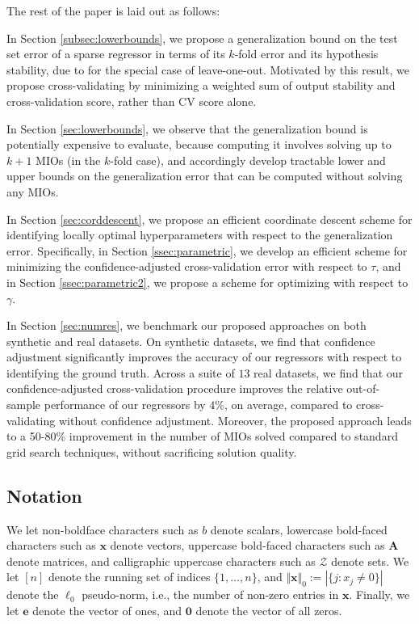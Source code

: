 \documentclass[mnsc,nonblindrev]{informs3} %
\begin{document}
The rest of the paper is laid out as follows:
\begin{itemize}{\color{black}
\item In Section \ref{subsec:lowerbounds}, we propose a generalization bound on the test set error of a sparse regressor in terms of its $k$-fold error and its hypothesis stability, due to \cite{bousquet2002stability} for the special case of leave-one-out. Motivated by this result, we propose cross-validating by minimizing a weighted sum of output stability and cross-validation score, rather than CV score alone.}
\item In Section \ref{sec:lowerbounds}, we observe that the generalization bound is potentially expensive to evaluate, because computing it involves solving up to {\color{black}$k+1$} MIOs (in the $k$-fold case), and accordingly develop tractable lower and upper bounds on the generalization error that can be computed without solving any MIOs.

\item In Section \ref{sec:corddescent}, we propose an efficient coordinate descent scheme for identifying locally optimal hyperparameters with respect to the generalization error. Specifically, in Section \ref{ssec:parametric}, we develop an efficient scheme for minimizing the confidence-adjusted {\color{black}cross-validation} error with respect to $\tau$, and in Section \ref{ssec:parametric2}, we propose a scheme for optimizing with respect to $\gamma$.
\item In Section \ref{sec:numres}, we benchmark our proposed approaches on both synthetic and real datasets. On synthetic datasets, we find that confidence adjustment significantly improves the accuracy of our regressors with respect to identifying the ground truth. Across a suite of $13$ real datasets, we find that our confidence-adjusted cross-validation procedure improves the relative out-of-sample performance of our regressors by $4\%$, on average, compared to cross-validating without confidence adjustment. Moreover, the proposed approach leads to a 50-80\% improvement in the number of MIOs solved compared to standard grid search techniques, without sacrificing solution quality.
\end{itemize}

\subsection*{Notation} We let non-boldface characters such as $b$ denote scalars, lowercase bold-faced characters such as $\bm{x}$ denote vectors, uppercase bold-faced characters such as $\bm{A}$ denote matrices, and calligraphic uppercase characters such as $\mathcal{Z}$ denote sets. We let $[n]$ denote the running set of indices $\{1, \dots, n\}$, and $\Vert \bm{x}\Vert_0:=|\{j: x_j \neq 0\}|$ denote the $\ell_0$ pseudo-norm, i.e., the number of non-zero entries in $\bm{x}$. Finally, we let $\bm{e}$ denote the vector of ones, and $\bm{0}$ denote the vector of all zeros. 
\end{document}
